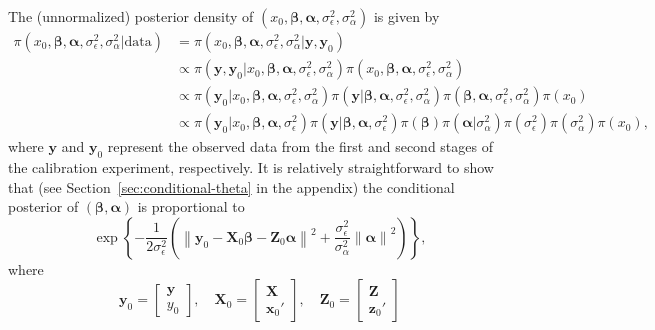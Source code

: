 \documentclass[cmfont,usenames,dvipsnames,leqno]{afit-etd}\usepackage[]{graphicx}\usepackage[]{color}
\newcommand{\norm}[1]{\left\|#1\right\|}
\begin{document}
The (unnormalized) posterior density of $(x_0, \bm{\beta}, \bm{\alpha}, \sigma_\epsilon^2, \sigma_\alpha^2)$ is given by
\begin{align*}
  \pi(x_0, \bm{\beta}, \bm{\alpha}, \sigma_\epsilon^2, \sigma_\alpha^2 | \text{data}) &= \pi(x_0, \bm{\beta}, \bm{\alpha}, \sigma_\epsilon^2, \sigma_\alpha^2 | \bm{y}, \bm{y}_0) \\
  &\propto \pi(\bm{y}, \bm{y}_0 | x_0, \bm{\beta}, \bm{\alpha}, \sigma_\epsilon^2, \sigma_\alpha^2)\pi(x_0, \bm{\beta}, \bm{\alpha}, \sigma_\epsilon^2, \sigma_\alpha^2) \\
  &\propto \pi(\bm{y}_0 | x_0, \bm{\beta}, \bm{\alpha}, \sigma_\epsilon^2, \sigma_\alpha^2)\pi(\bm{y} | \bm{\beta}, \bm{\alpha}, \sigma_\epsilon^2, \sigma_\alpha^2)\pi(\bm{\beta}, \bm{\alpha}, \sigma_\epsilon^2, \sigma_\alpha^2)\pi(x_0) \\
  &\propto \pi(\bm{y}_0 | x_0, \bm{\beta}, \bm{\alpha}, \sigma_\epsilon^2)\pi(\bm{y} | \bm{\beta}, \bm{\alpha}, \sigma_\epsilon^2)\pi(\bm{\beta})\pi(\bm{\alpha}|\sigma_\alpha^2)\pi(\sigma_\epsilon^2)\pi(\sigma_\alpha^2)\pi(x_0),
\end{align*}
where $\bm{y}$ and $\bm{y}_0$ represent the observed data from the first and second stages of the calibration experiment, respectively. It is relatively straightforward to show that (see Section~\ref{sec:conditional-theta} in the appendix) the conditional posterior of $(\bm{\beta}, \bm{\alpha})$ is proportional to
\begin{equation*}
  \exp\left\{ -\frac{1}{2\sigma_\epsilon^2}\left(\norm{\bm{y}_0 - \bm{X}_0\bm{\beta} - \bm{Z}_0\bm{\alpha}}^2 + \frac{\sigma_\epsilon^2}{\sigma_\alpha^2}\norm{\bm{\alpha}}^2\right) \right\},
\end{equation*}
where
\begin{equation*}
  \bm{y}_0 = \begin{bmatrix} \bm{y} \\ y_0 \end{bmatrix}, \quad
  \bm{X}_0 = \begin{bmatrix} \bm{X} \\ \bm{x}_0' \end{bmatrix}, \quad
  \bm{Z}_0 = \begin{bmatrix} \bm{Z} \\ \bm{z}_0' \end{bmatrix}
\end{equation*}
\end{document}
